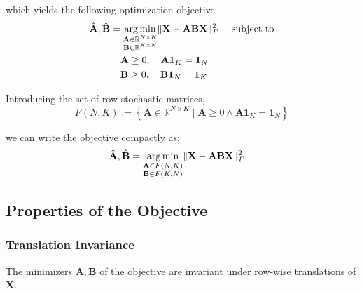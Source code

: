 \documentclass{article}
\DeclareMathOperator*{\argmin}{arg\,min}
\begin{document}
which yields the following optimization objective
\begin{equation}
\label{eq:objective}
    \begin{aligned}
        \hat{\mathbf{A}}, \hat{\mathbf{B}} =& \; \underset{\begin{subarray}{c} \mathbf{A} \in \mathbb{R}^{N \times K} \\
        \mathbf{B} \in \mathbb{R}^{K \times N} \end{subarray}}{\argmin} \| \mathbf{X} - \mathbf{A} \mathbf{B} \mathbf{X}\|_F^2 \quad \text{ subject to} \\
        & \mathbf{A} \geq 0, \quad \mathbf{A} \mathbf{1}_K = \mathbf{1}_N \\
        & \mathbf{B} \geq 0, \quad \mathbf{B} \mathbf{1}_N = \mathbf{1}_K
    \end{aligned}
\end{equation}

Introducing the set of row-stochastic matrices,
\begin{equation}
    F(N, K) := \left\{ \mathbf{A} \in \mathbb{R}^{N \times K} \mid  \mathbf{A} \geq 0 \land \mathbf{A} \mathbf{1}_K = \mathbf{1}_N \right\}
\end{equation}

we can write the objective compactly as:
\begin{equation}
    \begin{aligned}
    \hat{\mathbf{A}}, \hat{\mathbf{B}} =& \; \underset{\begin{subarray}{c} \mathbf{A} \in F(N, K) \\
        \mathbf{B} \in F(K, N) \end{subarray}}{\argmin} \| \mathbf{X} - \mathbf{A} \mathbf{B} \mathbf{X}\|_F^2
    \end{aligned}
\end{equation}

\subsection{Properties of the Objective}

\subsubsection{Translation Invariance}
\label{subsubsec:translation_invariance}

The minimizers $\mathbf{A}, \mathbf{B}$ of the objective are invariant under row-wise translations of $\mathbf{X}$.
\end{document}
